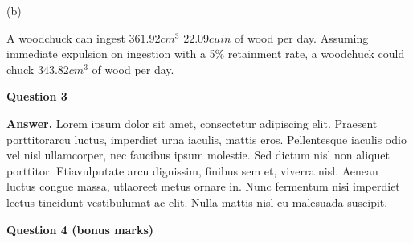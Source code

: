 \documentclass[13pt , a4paper]{article}
\begin{document}
\vskip -1cm
\vskip12mm
(b)\vskip-6.5mm
\begin{enumerate}
A woodchuck can ingest $361.92 cm^3$ \(22.09 cu in\) of wood per day. Assuming immediate expulsion on ingestion with a 5\% retainment rate, a woodchuck could chuck \textbf{$343.82 cm^3$}  of wood per day.
\end{enumerate}
\begin{center}
    \vskip10mm
    \Large{\textbf{Question 3}}
    \vskip8mm
\end{center}
\vskip10mm
\textbf{Answer.} Lorem ipsum dolor sit amet, consectetur adipiscing elit. Praesent porttitorarcu luctus, imperdiet urna iaculis, mattis eros. Pellentesque iaculis odio vel nisl ullamcorper, nec faucibus ipsum molestie. Sed dictum nisl non aliquet porttitor. Etiavulputate arcu dignissim, finibus sem et, viverra nisl. Aenean luctus congue massa, utlaoreet metus ornare in. Nunc fermentum nisi imperdiet lectus tincidunt vestibulumat ac elit. Nulla mattis nisl eu malesuada suscipit.
\begin{center}
    \vskip5mm
    \Large{\textbf{Question 4 (bonus marks)}}
    \vskip8mm
\end{center}
\vskip1mm
\end{document}
